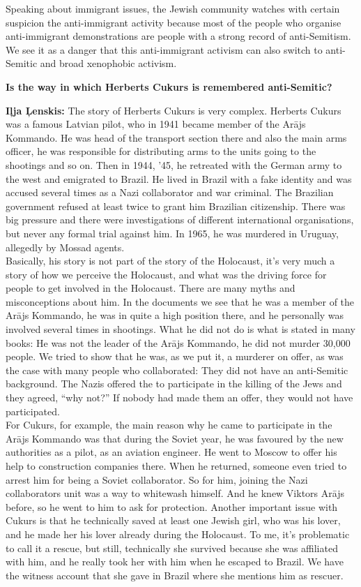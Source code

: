 Speaking about immigrant issues, the Jewish community watches with certain suspicion the anti-immigrant activity because most of the people who organise anti-immigrant demonstrations are people with a strong record of anti-Semitism. We see it as a danger that this anti-immigrant activism can also switch to anti-Semitic and broad xenophobic activism. 

\textbf{Is the way in which Herberts Cukurs is remembered anti-Semitic?} 

\textbf{Iļja Ļenskis:} The story of Herberts Cukurs is very complex. Herberts Cukurs was a famous Latvian pilot, who in 1941 became member of the Arājs Kommando. He was head of the transport section there and also the main arms officer, he was responsible for distributing arms to the units going to the shootings and so on. Then in 1944, '45, he retreated with the German army to the west and emigrated to Brazil. He lived in Brazil with a fake identity and was accused several times as a Nazi collaborator and war criminal. The Brazilian government refused at least twice to grant him Brazilian citizenship. There was big pressure and there were investigations of different international organisations, but never any formal trial against him. In 1965, he was murdered in Uruguay, allegedly by Mossad agents.\\
Basically, his story is not part of the story of the Holocaust, it’s very much a story of how we perceive the Holocaust, and what was the driving force for people to get involved in the Holocaust. There are many myths and misconceptions about him. In the documents we see that he was a member of the Arājs Kommando, he was in quite a high position there, and he personally was involved several times in shootings. What he did not do is what is stated in many books: He was not the leader of the Arājs Kommando, he did not murder 30,000 people. We tried to show that he was, as we put it, a murderer on offer, as was the case with many people who collaborated: They did not have an anti-Semitic background. The Nazis offered the to participate in the killing of the Jews and they agreed, ``why not?'' If nobody had made them an offer, they would not have participated.\\
For Cukurs, for example, the main reason why he came to participate in the Arājs Kommando was that during the Soviet year, he was favoured by the new authorities as a pilot, as an aviation engineer. He went to Moscow to offer his help to construction companies there. When he returned, someone even tried to arrest him for being a Soviet collaborator. So for him, joining the Nazi collaborators unit was a way to whitewash himself. And he knew Viktors Arājs before, so he went to him to ask for protection. Another important issue with Cukurs is that he technically saved at least one Jewish girl, who was his lover, and he made her his lover already during the Holocaust. To me, it’s problematic to call it a rescue, but still, technically she survived because she was affiliated with him, and he really took her with him when he escaped to Brazil. We have the witness account that she gave in Brazil where she mentions him as rescuer. \\
